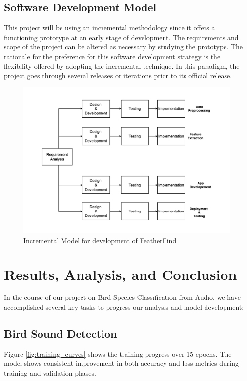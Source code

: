 \section{Software Development Model}
This project will be using an incremental methodology since it offers a
functioning prototype at an early stage of development. The requirements and
scope of the project can be altered as necessary by studying the prototype. The
rationale for the preference for this software development strategy is the
flexibility offered by adopting the incremental technique. In this paradigm,
the project goes through several releases or iterations prior to its official
release.
\begin{figure}[h!]
    \includegraphics[scale=0.25]{images/SDLC.png}
    \caption{Incremental Model for development of
        FeatherFind}%
\end{figure}

\chapter{Results, Analysis, and Conclusion}
In the course of our project on Bird Species Classification from Audio, we have
accomplished several key tasks to progress our analysis and model development:

\section{Bird Sound Detection}

Figure \ref{fig:training_curves} shows the training progress over 15 epochs. The model shows consistent improvement in both accuracy and loss metrics during training and validation phases.

